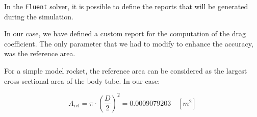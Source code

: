 In the \texttt{Fluent} solver, it is possible to define the reports that will be generated during the simulation.

In our case, we have defined a custom report for the computation of the drag coefficient.
The only parameter that we had to modify to enhance the accuracy, was the reference area.

For a simple model rocket, the reference area can be considered as the largest cross-sectional area of the body tube.
In our case:

\begin{equation}
    A_{\text{ref}} = \pi \cdot \left( \frac{D}{2} \right)^2 = 0.0009079203 \quad [m^2]
\end{equation}


